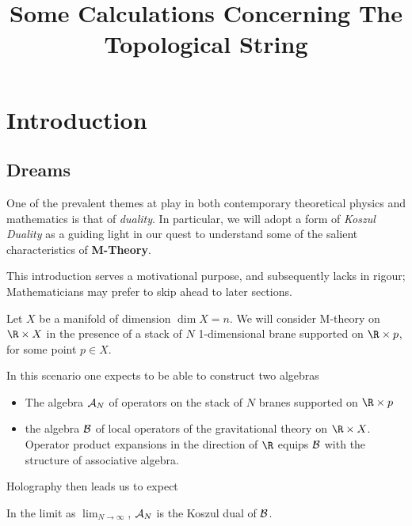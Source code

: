 \documentclass[12pt]{amsart}
\title{Some Calculations Concerning The Topological String}
\begin{document}

  
  \maketitle
  \tableofcontents
  \mbox{}

\section{Introduction}

\subsection{Dreams}
  One of the prevalent themes at play in both contemporary theoretical physics
  and mathematics is that of \textit{duality}. In particular, we will adopt a
  form of \textit{Koszul Duality} as a guiding light in our quest to understand
  some of the salient characteristics of \textbf{M-Theory}.\par

  \begin{rmk}
    This introduction serves a motivational purpose, and subsequently lacks in
    rigour; Mathematicians may prefer to skip ahead to later sections.
  \end{rmk}

  Let $X$ be a manifold of dimension $\dim X = n$. We will consider
  M-theory on $\R \times X$ in the presence of a stack of $N$ 1-dimensional brane supported
  on $\R \times p$, for some point $p \in X$.

  In this scenario one expects to be able to construct two algebras

  \begin{itemize}
    \item The algebra $\mathcal{A}_N$ of operators on the stack of $N$ branes supported
      on $\R \times p$
    \item the algebra $\mathcal{B}$ of local operators of the gravitational theory
      on $\R \times X$. Operator product expansions in the direction of $\R$ equips $\mathcal{B}$ with the
  structure of associative algebra.
  \end{itemize}

  Holography then leads us to expect
  \begin{conj}
    In the limit as $\lim_{N \rightarrow \infty}$, $\mathcal{A}_N$ is the Koszul
    dual of $\mathcal{B}$.
  \end{conj}
\end{document}
